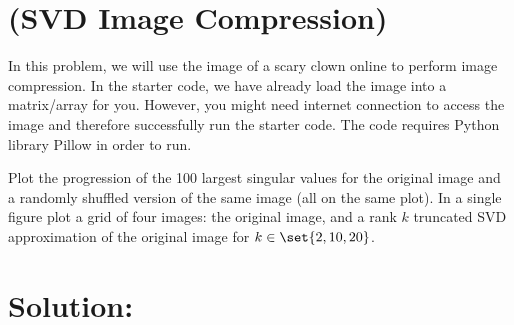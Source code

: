 \documentclass[189]{pset}
\begin{document}

  \section{(SVD Image Compression)}
    In this problem, we will use the image of a scary clown online to
    perform image compression.  In the starter code, we have already
    load the image into a matrix/array for you. However, you might
    need internet connection to access the image and therefore
    successfully run the starter code. The code requires Python
    library Pillow in order to run.

    Plot the progression of the 100 largest singular values for the
    original image and a randomly shuffled version of the same image
    (all on the same plot). In a single figure plot a grid of four
    images: the original image, and a rank $k$ truncated SVD
    approximation of the original image for $k \in \set{2,10,20}$.

  \hrulefill

  \section*{Solution:}
\end{document}
